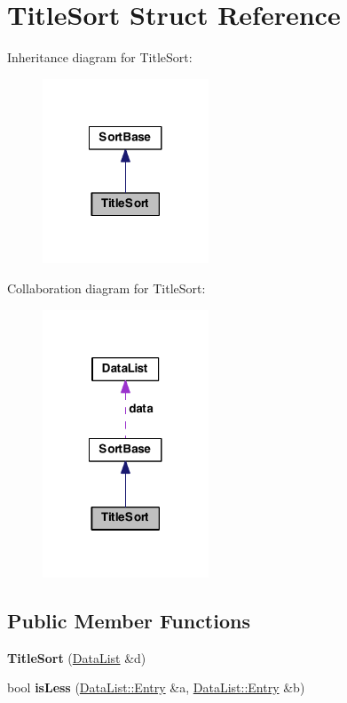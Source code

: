 \hypertarget{struct_title_sort}{\section{Title\-Sort Struct Reference}
\label{struct_title_sort}
}


Inheritance diagram for Title\-Sort\-:
\nopagebreak
\begin{figure}[H]
\begin{center}
\leavevmode
\includegraphics[width=140pt]{struct_title_sort__inherit__graph}
\end{center}
\end{figure}


Collaboration diagram for Title\-Sort\-:
\nopagebreak
\begin{figure}[H]
\begin{center}
\leavevmode
\includegraphics[width=140pt]{struct_title_sort__coll__graph}
\end{center}
\end{figure}
\subsection*{Public Member Functions}
\begin{DoxyCompactItemize}
\item 
\hypertarget{struct_title_sort_a09bc57a31b79d01570f817e4083a8526}{{\bfseries Title\-Sort} (\hyperlink{struct_data_list}{Data\-List} \&d)}\label{struct_title_sort_a09bc57a31b79d01570f817e4083a8526}

\item 
\hypertarget{struct_title_sort_aff6baf921f0f274c5434e30cc39f35d2}{bool {\bfseries is\-Less} (\hyperlink{struct_data_list_1_1_entry}{Data\-List\-::\-Entry} \&a, \hyperlink{struct_data_list_1_1_entry}{Data\-List\-::\-Entry} \&b)}\label{struct_title_sort_aff6baf921f0f274c5434e30cc39f35d2}

\end{DoxyCompactItemize}

